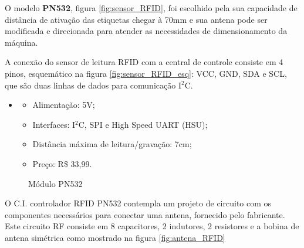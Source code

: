     O modelo \textbf{PN532}, figura \ref{fig:sensor_RFID}, foi escolhido pela sua capacidade de distância de ativação das etiquetas chegar à 70mm e sua antena pode ser modificada e direcionada para atender as necessidades de dimensionamento da máquina.
    
    A conexão do sensor de leitura RFID com a central de controle consiste em 4 pinos, esquemático na figura \ref{fig:sensor_RFID_esq}: VCC, GND, SDA e SCL, que são duas linhas de dados para comunicação I$^2$C.
    
    \begin{itemize}
    \item[ ]
        \begin{itemize}
            \item Alimentação: 5V;
            \item Interfaces: I$^2$C, SPI e High Speed UART (HSU);
            \item Distância máxima de leitura/gravação: 7cm;
            \item Preço: R\$ 33,99.
        \end{itemize}
    \end{itemize}
    
\begin{figure}[H]
    \centering
    \hspace{0.05\textwidth}
    \caption{Módulo PN532}\label{fig:modulo_RFID}
\end{figure}
    
    O C.I. controlador RFID PN532 contempla um projeto de circuito com os componentes necessários para conectar uma antena, fornecido pelo fabricante. Este circuito RF consiste em 8 capacitores, 2 indutores, 2 resistores e a bobina de antena simétrica como mostrado na figura \ref{fig:antena_RFID}
    
